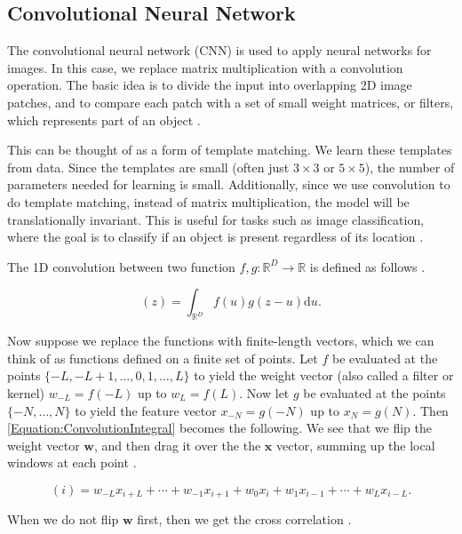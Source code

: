 \documentclass[../../../main.tex]{subfiles}
\begin{document}
\subsection{Convolutional Neural Network}

The convolutional neural network (CNN) is used to apply neural networks for images. In this case, we replace matrix multiplication with a convolution operation. The basic idea is to divide the input into overlapping 2D image patches, and to compare each patch with a set of small weight matrices, or filters, which represents part of an object \autocite{Murphy2022}.

This can be thought of as a form of template matching. We learn these templates from data. Since the templates are small (often just $3 \times 3$ or $5 \times 5$), the number of parameters needed for learning is small. Additionally, since we use convolution to do template matching, instead of matrix multiplication, the model will be translationally invariant. This is useful for tasks such as image classification, where the goal is to classify if an object is present regardless of its location \autocite{Murphy2022}.

The 1D convolution between two function $f,g:\mathbb{R}^D\to\mathbb{R}$ is defined as follows \autocite{Murphy2022}.

\begin{equation}
[f \circledast g](z) = \int_{\mathbb{R}^D}f(u)g(z-u)\mathrm{d}u.
\label{Equation:ConvolutionIntegral}
\end{equation}

Now suppose we replace the functions with finite-length vectors, which we can think of as functions defined on a finite set of points. Let $f$ be evaluated at the points $\{-L,-L+1,\ldots,0,1,\ldots,L\}$ to yield the weight vector (also called a filter or kernel) $w_{-L}=f(-L)$ up to $w_L=f(L)$. Now let $g$ be evaluated at the points $\{-N,\ldots,N\}$ to yield the feature vector $x_{-N}=g(-N)$ up to $x_N=g(N)$. Then \autoref{Equation:ConvolutionIntegral} becomes the following. We see that we flip the weight vector $\bm{w}$, and then drag it over the the $\bm{x}$ vector, summing up the local windows at each point \autocite{Murphy2022}.

\begin{equation}
[\bm{w}\circledast\bm{x}](i) = w_{-L}x_{i+L}+\cdots+w_{-1}x_{i+1}+w_0x_i+w_1x_{i-1}+\cdots+w_Lx_{i-L}.
\end{equation}

When we do not flip $\bm{w}$ first, then we get the cross correlation \autocite{Murphy2022}.
\end{document}
